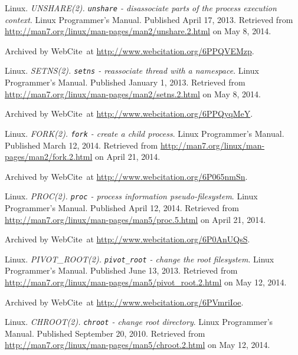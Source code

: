 \begin{thebibliography}{9}
Linux. \emph{UNSHARE(2). \texttt{unshare} - disassociate parts of the process
execution context}. Linux Programmer's Manual. Published April 17, 2013.
Retrieved from \url{http://man7.org/linux/man-pages/man2/unshare.2.html} on May
8, 2014.

Archived by WebCite\textsuperscript{\textregistered}\ at
\url{http://www.webcitation.org/6PPQVEMzp}.


Linux. \emph{SETNS(2). \texttt{setns} - reassociate thread with a namespace}.
Linux Programmer's Manual. Published January 1, 2013.  Retrieved from
\url{http://man7.org/linux/man-pages/man2/setns.2.html} on May 8, 2014.

Archived by WebCite\textsuperscript{\textregistered}\ at
\url{http://www.webcitation.org/6PPQyqMeY}.


Linux. \emph{FORK(2). \texttt{fork} - create a child process}. Linux
Programmer's Manual. Published March 12, 2014. Retrieved from
\url{http://man7.org/linux/man-pages/man2/fork.2.html} on April 21, 2014.

Archived by WebCite\textsuperscript{\textregistered}\ at
\url{http://www.webcitation.org/6P065nmSn}.


Linux. \emph{PROC(2). \texttt{proc} - process information pseudo-filesystem}.
Linux Programmer's Manual. Published April 12, 2014. Retrieved from
\url{http://man7.org/linux/man-pages/man5/proc.5.html} on April 21, 2014.

Archived by WebCite\textsuperscript{\textregistered}\ at
\url{http://www.webcitation.org/6P0AnUQsS}.


Linux. \emph{PIVOT\_ROOT(2). \texttt{pivot\_root} - change the root
filesystem}.  Linux Programmer's Manual. Published June 13, 2013. Retrieved
from \url{http://man7.org/linux/man-pages/man5/pivot_root.2.html} on May 12,
2014.

Archived by WebCite\textsuperscript{\textregistered}\ at
\url{http://www.webcitation.org/6PVmriIoe}.


Linux. \emph{CHROOT(2). \texttt{chroot} - change root directory}.  Linux
Programmer's Manual. Published September 20, 2010. Retrieved from
\url{http://man7.org/linux/man-pages/man5/chroot.2.html} on May 12, 2014.


\end{thebibliography}
